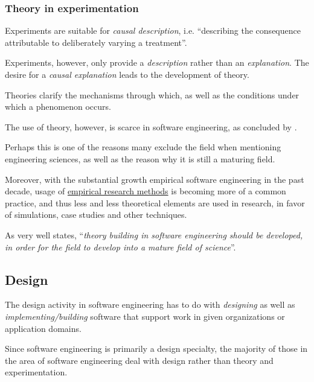 \documentclass[a4paper]{article}
\begin{document}
            \subsubsection{Theory in experimentation}

                Experiments are suitable for \emph{causal description}, i.e. ``describing the consequence attributable to deliberately varying a treatment\supercite{hannaysestematic}''.

                Experiments, however, only provide a \emph{description} rather than an \emph{explanation}.
                The desire for a \emph{causal explanation} leads to the development of theory.

                Theories clarify the mechanisms through which, as well as the conditions under which a phenomenon occurs.

                The use of theory, however, is scarce in software engineering, as concluded by \cite{hannaysestematic}. 
                
                Perhaps this is one of the reasons many exclude the field when mentioning engineering sciences, as well as the reason why it is still a maturing field.

                Moreover,  with the substantial growth empirical software engineering in the past decade, usage of \hyperlink{empiricalmethod}{empirical research methods} is becoming more of a common practice, and thus less and less theoretical elements are used in research, in favor of simulations, case studies and other techniques.

                As \cite{wohlin2012experimentation} very well states, ``\emph{theory building in software engineering should be developed, in order for the field to develop into a mature field of science}''.

        \subsection{Design}

            The design activity in software engineering has to do with \emph{designing} as well as \emph{implementing/building} software that support work in given organizations or application domains\supercite{denning2000computer}.

            Since software engineering is primarily a design specialty, the majority of those in the area of software engineering deal with design rather than theory and experimentation.
\end{document}

